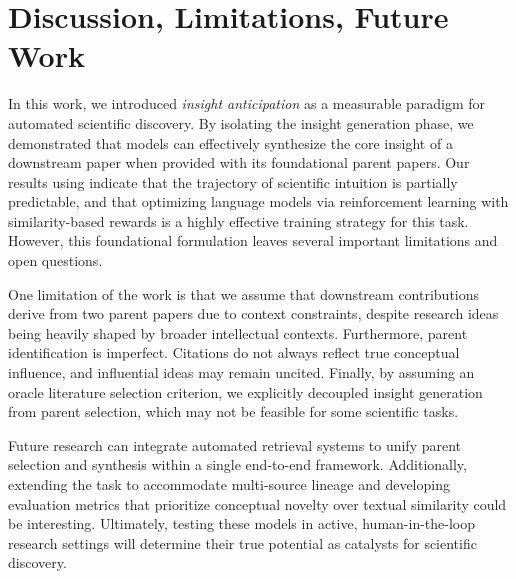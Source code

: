 \section{Discussion, Limitations, Future Work}
In this work, we introduced \emph{insight anticipation} as a measurable paradigm for automated scientific discovery. By isolating the insight generation phase, we demonstrated that models can effectively synthesize the core insight of a downstream paper when provided with its foundational parent papers. Our results using \ourmethod{} indicate that the trajectory of scientific intuition is partially predictable, and that optimizing language models via reinforcement learning with similarity-based rewards is a highly effective training strategy for this task. However, this foundational formulation leaves several important limitations and open questions.

One limitation of the work is that we assume that downstream contributions derive from two parent papers due to context constraints, despite research ideas being heavily shaped by broader intellectual contexts. Furthermore, parent identification is imperfect. Citations do not always reflect true conceptual influence, and influential ideas may remain uncited. Finally, by assuming an oracle literature selection criterion, we explicitly decoupled insight generation from parent selection, which may not be feasible for some scientific tasks.

Future research can integrate automated retrieval systems to unify parent selection and synthesis within a single end-to-end framework. Additionally, extending the task to accommodate multi-source lineage and developing evaluation metrics that prioritize conceptual novelty over textual similarity could be interesting. Ultimately, testing these models in active, human-in-the-loop research settings will determine their true potential as catalysts for scientific discovery.




